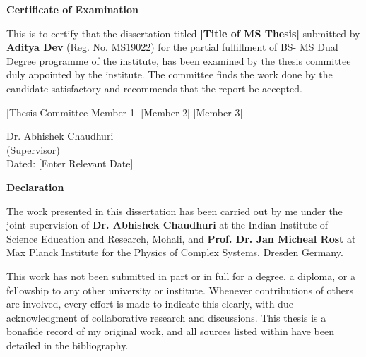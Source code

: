 \documentclass[a4paper, 12pt,  twoside,]{report}
\begin{document}

\sffamily
\begin{center}
    \textbf{\Large Certificate of Examination}
\end{center}

This is to certify that the dissertation titled \textbf{[Title of MS Thesis]} submitted by \textbf{Aditya Dev} (Reg. No. MS19022) for the partial fulfillment of BS- MS Dual Degree programme of the institute, has been examined by the thesis committee duly appointed by the institute. The committee finds the work done by the candidate satisfactory and recommends that the report be accepted.

\vspace{4cm}

[Thesis Committee Member 1] \hspace{1.5cm} [Member 2] \hspace{1.5cm} [Member 3]

\vspace{4cm}

\begin{flushright}
    Dr. Abhishek Chaudhuri
    \\
    (Supervisor)
    \\
    \vspace{4cm}
    Dated: [Enter Relevant Date]
\end{flushright}

\cleardoublepage

\begin{center}
    \textbf{\Large Declaration}
\end{center}
The work presented in this dissertation has been carried out by me under the joint supervision of \textbf{Dr. Abhishek Chaudhuri} at the Indian Institute of Science Education and Research, Mohali, and \textbf{Prof. Dr.  Jan Micheal Rost} at Max Planck Institute for the Physics of Complex Systems, Dresden Germany. 

\vspace{0.4cm}

This work has not been submitted in part or in full for a degree, a diploma, or a fellowship to any other university or institute. Whenever contributions of others are involved, every effort is made to indicate this clearly, with due acknowledgment of collaborative research and discussions. This thesis is a bonafide record of my original work, and all sources listed within have been detailed in the bibliography.
\end{document}
